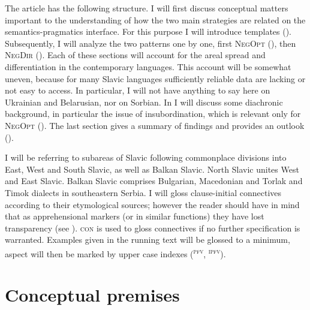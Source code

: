 \documentclass[output=paper,colorlinks,citecolor=brown]{langscibook}
\begin{document}
The article has the following structure. I will first discuss conceptual matters important to the understanding of how the two main strategies are related on the semantics-pragmatics interface. For this purpose I will introduce templates (). Subsequently, I will analyze the two patterns one by one, first \textsc{NegOpt} (), then \textsc{NegDir} (). Each of these sections will account for the areal spread and differentiation in the contemporary languages. This account will be somewhat uneven, because for many Slavic languages sufficiently reliable data are lacking or not easy to access. In particular, I will not have anything to say here on Ukrainian and Belarusian, nor on Sorbian. In  I will discuss some diachronic background, in particular the issue of insubordination, which is relevant only for \textsc{NegOpt} (). The last section gives a summary of findings and provides an outlook ().


I will be referring to subareas of Slavic following commonplace divisions into East, West and South Slavic, as well as Balkan Slavic. North Slavic unites West and East Slavic. Balkan Slavic comprises Bulgarian, Macedonian and Torlak and Timok dialects in southeastern Serbia. I will gloss clause-initial connectives according to their etymological sources; however the reader should have in mind that as apprehensional markers (or in similar functions) they have lost transparency (see ). \textsc{con} is used to gloss connectives if no further specification is warranted. Examples given in the running text will be glossed to a minimum, aspect will then be marked by upper case indexes (\textsc{\textsuperscript{pfv}}, \textsc{\textsuperscript{ipfv}}).


\section{Conceptual premises} \label{sec:conprem}
\end{document}
